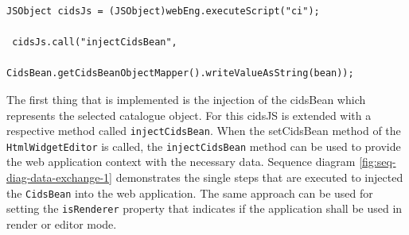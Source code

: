 \begin{lstlisting}[label=lst:inject_bean,caption=Injecting the cidsBean to the JavaScript application]
JSObject cidsJs = (JSObject)webEng.executeScript("ci");

 cidsJs.call("injectCidsBean",
              CidsBean.getCidsBeanObjectMapper().writeValueAsString(bean));
\end{lstlisting}

The first thing that is implemented is the injection of the cidsBean which represents the selected catalogue object.
For this cidsJS is extended with a respective method called \texttt{injectCidsBean}.
When the setCidsBean method of the \texttt{HtmlWidgetEditor} is called, the \texttt{injectCidsBean} method can be used to provide the web application context with the necessary data.
Sequence diagram  \ref{fig:seq-diag-data-exchange-1} demonstrates the single steps that are executed to injected the  \texttt{CidsBean} into the web application.
The same approach can be used for setting the \texttt{isRenderer} property that indicates if the application shall be used in render or editor mode.

